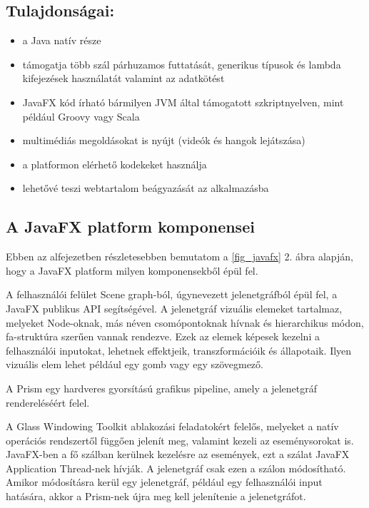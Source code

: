 \subsection*{Tulajdonságai:}
\begin{itemize}
\item a Java natív része 
\item támogatja több szál párhuzamos futtatását, generikus típusok és lambda kifejezések használatát valamint az adatkötést 
\item JavaFX kód írható bármilyen JVM által támogatott szkriptnyelven, mint például Groovy vagy Scala 
\item multimédiás megoldásokat is nyújt (videók és hangok lejátszása) 
\item a platformon elérhető kodekeket használja 
\item lehetővé teszi webtartalom beágyazását az alkalmazásba
\end{itemize}

\subsection*{A JavaFX platform komponensei}

Ebben az alfejezetben részletesebben bemutatom a \ref{fig_javafx} 2. ábra alapján, hogy a JavaFX platform milyen komponensekből épül fel. 



A felhasználói felület Scene graph-ból, úgynevezett jelenetgráfból épül fel, a JavaFX publikus API segítségével. A jelenetgráf vizuális elemeket tartalmaz, melyeket Node-oknak, más néven csomópontoknak hívnak és hierarchikus módon, fa-struktúra szerűen vannak rendezve. Ezek az elemek képesek kezelni a felhasználói inputokat, lehetnek effektjeik, transzformációik és állapotaik. Ilyen vizuális elem lehet például egy gomb vagy egy szövegmező.  

A Prism egy hardveres gyorsítású grafikus pipeline, amely a jelenetgráf rendereléséért felel. 

A Glass Windowing Toolkit ablakozási feladatokért felelős, melyeket a natív operációs rendszertől függően jelenít meg, valamint kezeli az eseménysorokat is. JavaFX-ben a fő szálban kerülnek kezelésre az események, ezt a szálat JavaFX Application Thread-nek hívják. A jelenetgráf csak ezen a szálon módosítható. Amikor módosításra kerül egy jelenetgráf, például egy felhasználói input hatására, akkor a Prism-nek újra meg kell jelenítenie a jelenetgráfot.  

